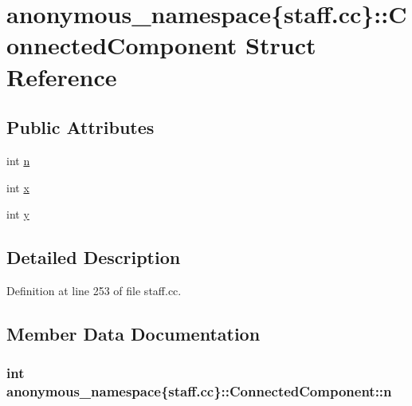 \hypertarget{structanonymous__namespace_02staff_8cc_03_1_1ConnectedComponent}{}\section{anonymous\+\_\+namespace\{staff.\+cc\}\+:\+:Connected\+Component Struct Reference}
\label{structanonymous__namespace_02staff_8cc_03_1_1ConnectedComponent}
\subsection*{Public Attributes}
\begin{DoxyCompactItemize}
\item 
int \hyperlink{structanonymous__namespace_02staff_8cc_03_1_1ConnectedComponent_a729ec37be171261b9adbb465550cf870}{n}
\item 
int \hyperlink{structanonymous__namespace_02staff_8cc_03_1_1ConnectedComponent_ad2ce06c074c1346400bc13dedc81db34}{x}
\item 
int \hyperlink{structanonymous__namespace_02staff_8cc_03_1_1ConnectedComponent_a237de14dcb8f2dfba7f4a7d660eb64cf}{y}
\end{DoxyCompactItemize}


\subsection{Detailed Description}


Definition at line 253 of file staff.\+cc.



\subsection{Member Data Documentation}
\subsubsection[{\texorpdfstring{n}{n}}]{\setlength{\rightskip}{0pt plus 5cm}int anonymous\+\_\+namespace\{staff.\+cc\}\+::Connected\+Component\+::n}\hypertarget{structanonymous__namespace_02staff_8cc_03_1_1ConnectedComponent_a729ec37be171261b9adbb465550cf870}{}\label{structanonymous__namespace_02staff_8cc_03_1_1ConnectedComponent_a729ec37be171261b9adbb465550cf870}


